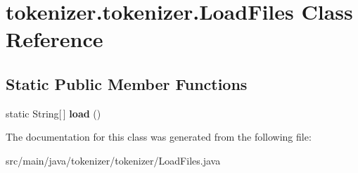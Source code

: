 \hypertarget{classtokenizer_1_1tokenizer_1_1_load_files}{}\section{tokenizer.\+tokenizer.\+Load\+Files Class Reference}
\label{classtokenizer_1_1tokenizer_1_1_load_files}
\subsection*{Static Public Member Functions}
\begin{DoxyCompactItemize}
\item 
\hypertarget{classtokenizer_1_1tokenizer_1_1_load_files_a6f654927dccf8a90c4288c02e108f472}{}static String\mbox{[}$\,$\mbox{]} {\bfseries load} ()\label{classtokenizer_1_1tokenizer_1_1_load_files_a6f654927dccf8a90c4288c02e108f472}

\end{DoxyCompactItemize}


The documentation for this class was generated from the following file\+:\begin{DoxyCompactItemize}
\item 
src/main/java/tokenizer/tokenizer/Load\+Files.\+java\end{DoxyCompactItemize}
